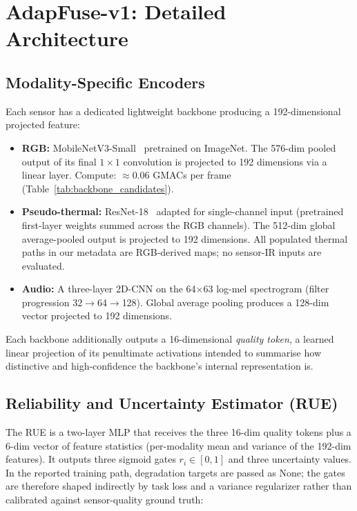\section{AdapFuse-v1: Detailed Architecture}

\subsection{Modality-Specific Encoders}

Each sensor has a dedicated lightweight backbone producing a 192-dimensional projected feature:

\begin{itemize}
    \item \textbf{RGB:} MobileNetV3-Small~\cite{howard2019mobilenetv3} pretrained on ImageNet. The 576-dim pooled output of its final $1\times1$ convolution is projected to 192 dimensions via a linear layer. Compute: $\approx$0.06 GMACs per frame (Table~\ref{tab:backbone_candidates}).
    \item \textbf{Pseudo-thermal:} ResNet-18~\cite{he2016deep} adapted for single-channel input (pretrained first-layer weights summed across the RGB channels). The 512-dim global average-pooled output is projected to 192 dimensions. All populated thermal paths in our metadata are RGB-derived maps; no sensor-IR inputs are evaluated.
    \item \textbf{Audio:} A three-layer 2D-CNN on the 64$\times$63 log-mel spectrogram (filter progression 32$\to$64$\to$128). Global average pooling produces a 128-dim vector projected to 192 dimensions.
\end{itemize}

Each backbone additionally outputs a 16-dimensional \textit{quality token}, a learned linear projection of its penultimate activations intended to summarise how distinctive and high-confidence the backbone's internal representation is.

\subsection{Reliability and Uncertainty Estimator (RUE)}

The RUE is a two-layer MLP that receives the three 16-dim quality tokens plus a 6-dim vector of feature statistics (per-modality mean and variance of the 192-dim features). It outputs three sigmoid gates $r_i \in [0,1]$ and three uncertainty values. In the reported training path, degradation targets are passed as None; the gates are therefore shaped indirectly by task loss and a variance regularizer rather than calibrated against sensor-quality ground truth:

